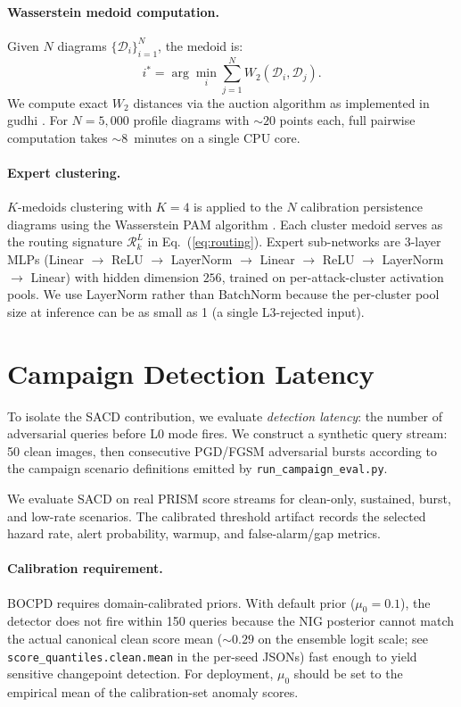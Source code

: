 \paragraph{Wasserstein medoid computation.}
Given $N$ diagrams $\{\mathcal{D}_i\}_{i=1}^N$, 
the medoid is:
\[
  i^* = \arg\min_{i} \sum_{j=1}^N W_2(\mathcal{D}_i, \mathcal{D}_j).
\]
We compute exact $W_2$ distances via the auction algorithm 
as implemented in gudhi \cite{gudhi2015}.
For $N=5{,}000$ profile diagrams with $\sim 20$ points each,
full pairwise computation takes $\sim 8$~minutes on a single CPU core.

\paragraph{Expert clustering.}
$K$-medoids clustering with $K=4$ is applied to the $N$ calibration 
persistence diagrams using the Wasserstein PAM algorithm \cite{schubert2021fast}.
Each cluster medoid serves as the routing signature $\mathcal{R}_k^L$
in Eq.~(\ref{eq:routing}).
Expert sub-networks are 3-layer MLPs (Linear $\to$ ReLU $\to$ LayerNorm
$\to$ Linear $\to$ ReLU $\to$ LayerNorm $\to$ Linear) with hidden dimension
$256$, trained on per-attack-cluster activation pools. We use LayerNorm
rather than BatchNorm because the per-cluster pool size at inference can be
as small as 1 (a single L3-rejected input).


\section{Campaign Detection Latency}
\label{app:campaign}

To isolate the SACD contribution, we evaluate \emph{detection latency}: 
the number of adversarial queries before L0 mode fires.
We construct a synthetic query stream: 50 clean images, 
then consecutive PGD/FGSM adversarial bursts according to the campaign
scenario definitions emitted by \texttt{run\_campaign\_eval.py}.

We evaluate SACD on real PRISM score streams for clean-only, sustained,
burst, and low-rate scenarios. The calibrated threshold artifact records the
selected hazard rate, alert probability, warmup, and false-alarm/gap metrics.

\paragraph{Calibration requirement.}
BOCPD requires domain-calibrated priors.
With default prior ($\mu_0=0.1$), the detector does not fire within 150
queries because the NIG posterior cannot match the actual canonical clean
score mean ($\sim 0.29$ on the ensemble logit scale; see
\texttt{score\_quantiles.clean.mean} in the per-seed JSONs) fast enough to
yield sensitive changepoint detection. For deployment, $\mu_0$ should be
set to the empirical mean of the calibration-set anomaly scores.

